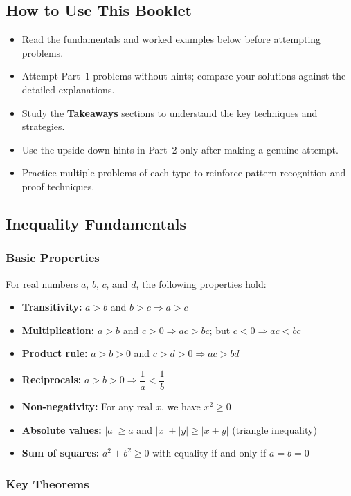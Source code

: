 \documentclass[12pt]{article}
\begin{document}
\subsection{How to Use This Booklet}
\begin{itemize}[leftmargin=*]
  \item Read the fundamentals and worked examples below before attempting problems.
  \item Attempt Part~1 problems without hints; compare your solutions against the detailed explanations.
  \item Study the \textbf{Takeaways} sections to understand the key techniques and strategies.
  \item Use the upside-down hints in Part~2 only after making a genuine attempt.
  \item Practice multiple problems of each type to reinforce pattern recognition and proof techniques.
\end{itemize}

\subsection{Inequality Fundamentals}

\subsubsection{Basic Properties}
For real numbers $a$, $b$, $c$, and $d$, the following properties hold:
\begin{itemize}[leftmargin=*]
    \item \textbf{Transitivity:} $a > b$ and $b > c \Rightarrow a > c$
    \item \textbf{Multiplication:} $a > b$ and $c > 0 \Rightarrow ac > bc$; but $c < 0 \Rightarrow ac < bc$
    \item \textbf{Product rule:} $a > b > 0$ and $c > d > 0 \Rightarrow ac > bd$
    \item \textbf{Reciprocals:} $a > b > 0 \Rightarrow \dfrac{1}{a} < \dfrac{1}{b}$
    \item \textbf{Non-negativity:} For any real $x$, we have $x^2 \ge 0$
    \item \textbf{Absolute values:} $|a| \ge a$ and $|x| + |y| \ge |x + y|$ (triangle inequality)
    \item \textbf{Sum of squares:} $a^2 + b^2 \ge 0$ with equality if and only if $a = b = 0$
\end{itemize}

\subsubsection{Key Theorems}
\end{document}
